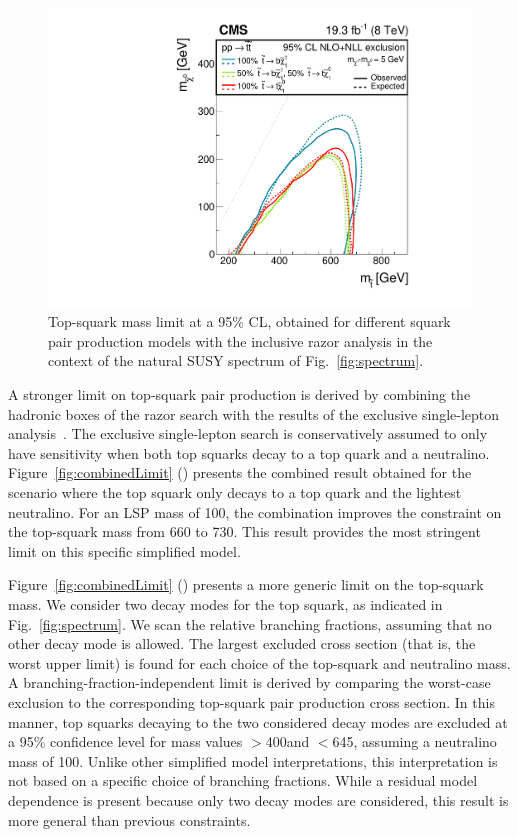 \begin{figure}[tb!]
\centering
 \includegraphics[width=\cmsFigWidth]{figs/analysis8TeV/T2HybridNew0Lp1Lp2LBARE.pdf}
 \caption{Top-squark mass limit at a 95\% CL, obtained for different
   squark pair production models with the inclusive razor analysis in the
   context of the natural SUSY spectrum of
   Fig.~\ref{fig:spectrum}.\label{fig:stopSUMMARY}}

\end{figure}

A stronger limit on top-squark pair production is derived by combining
the hadronic boxes of the razor search with the results of the
exclusive single-lepton analysis~\cite{1LepMVA}. The exclusive
single-lepton search is conservatively assumed to only have
sensitivity when both top squarks decay to a top quark and a
neutralino. Figure~\ref{fig:combinedLimit} (\cmsLeft) presents the combined result obtained for the scenario where the top
squark only decays to a top quark and the lightest neutralino. For an
LSP mass of 100\GeV, the combination improves the constraint on the
top-squark mass from 660 to 730\GeV. This result provides the
most stringent limit on this specific simplified model.


Figure~\ref{fig:combinedLimit} (\cmsRight) presents a more generic limit on the
top-squark mass. We consider two decay modes for the top squark, as
indicated in Fig.~\ref{fig:spectrum}. We scan the relative branching
fractions, assuming that no other decay mode is allowed. The largest
excluded cross section (that is, the worst upper limit) is found for
each choice of the top-squark and neutralino mass. A
branching-fraction-independent limit is derived by comparing the
worst-case exclusion to the corresponding top-squark pair production
cross section. In this manner, top squarks decaying to the two
considered decay modes are excluded at a 95\% confidence level for
mass values $>$400\GeV and $<$645\GeV, assuming a neutralino mass of
100\GeV. Unlike other simplified model interpretations, this
interpretation is not based on a specific choice of branching
fractions. While a residual model dependence is present because only
two decay modes are considered, this result is more general than
previous constraints.

